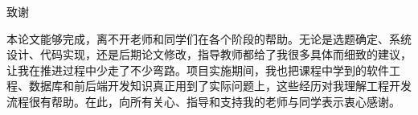 \documentclass[12pt, a4paper, oneside]{ctexrep}
\begin{document}
\clearpage
{}
{}
\vspace*{24pt}
\begin{center}
  {\heiti\fontsize{16pt}{16pt}\selectfont 致谢}
\end{center}
\vspace{18pt}

{\fangsong\fontsize{12pt}{20pt}\selectfont
本论文能够完成，离不开老师和同学们在各个阶段的帮助。无论是选题确定、系统设计、代码实现，还是后期论文修改，指导教师都给了我很多具体而细致的建议，让我在推进过程中少走了不少弯路。项目实施期间，我也把课程中学到的软件工程、数据库和前后端开发知识真正用到了实际问题上，这些经历对我理解工程开发流程很有帮助。在此，向所有关心、指导和支持我的老师与同学表示衷心感谢。
}

\end{document}
